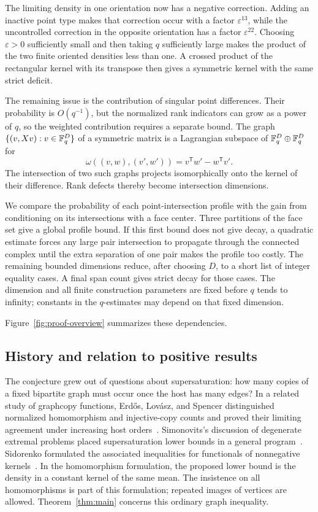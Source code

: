 The limiting density in one orientation now has a negative correction.
Adding an inactive point type makes that correction occur with a factor
\(\varepsilon^{13}\), while the uncontrolled correction in the
opposite orientation has a factor \(\varepsilon^{22}\). Choosing
\(\varepsilon>0\) sufficiently small and then taking \(q\) sufficiently
large makes the product of the two finite oriented densities less than
one. A crossed product of the rectangular kernel
with its transpose then gives a symmetric kernel with the same strict
deficit.

The remaining issue is the contribution of singular point
differences. Their probability is \(O(q^{-1})\), but the normalized
rank indicators can grow as a power of \(q\), so the weighted
contribution requires a separate bound. The graph
\(\{(v,Xv):v\in\mathbb F_q^D\}\) of a symmetric matrix is a Lagrangian
subspace of \(\mathbb F_q^D\oplus\mathbb F_q^D\) for
\[
 \omega((v,w),(v',w'))=v^{\mathsf T}w'-w^{\mathsf T}v'.
\]
The intersection of two such graphs projects isomorphically onto
the kernel of their difference. Rank defects thereby become
intersection dimensions.

We compare the probability of each point-intersection profile with
the gain from conditioning on its intersections with a face center.
Three partitions of the face set give a global profile bound. If this
first bound does not give decay, a quadratic estimate forces any large
pair intersection to propagate through the connected complex until
the extra separation of one pair makes the profile too costly. The
remaining bounded dimensions reduce, after choosing \(D\), to a
short list of integer equality cases. A final span count gives strict
decay for those cases. The dimension and all finite construction
parameters are fixed before \(q\) tends to infinity; constants in
the \(q\)-estimates may depend on that fixed dimension.

Figure~\ref{fig:proof-overview} summarizes these dependencies.



\subsection*{History and relation to positive results}

The conjecture grew out of questions about supersaturation: how many
copies of a fixed bipartite graph must occur once the host has many
edges? In a related study of graphcopy functions, Erd\H{o}s,
Lov\'asz, and Spencer distinguished normalized homomorphism and
injective-copy counts and proved their limiting agreement under
increasing host orders~\cite{erdoslovaszspencer1979}.
Simonovits's discussion of degenerate extremal problems placed
supersaturation lower bounds in a general program~\cite{simonovits1984}.
Sidorenko formulated the associated inequalities for functionals of
nonnegative kernels~\cite{sidorenko1991,sidorenko1993}.  In the
homomorphism formulation, the proposed lower bound is the density in
a constant kernel of the same mean.  The insistence on all
homomorphisms is part of this formulation; repeated images of vertices
are allowed.  Theorem~\ref{thm:main} concerns this ordinary graph
inequality.

